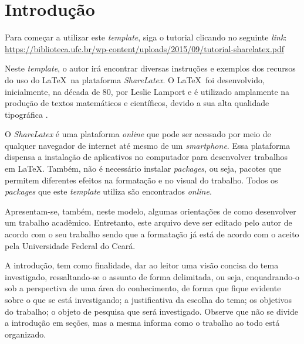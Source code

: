\chapter{Introdução}
\label{cap:introducao}


Para começar a utilizar este \textit{template}, siga o tutorial clicando no seguinte \textit{link}:
\url{https://biblioteca.ufc.br/wp-content/uploads/2015/09/tutorial-sharelatex.pdf}

Neste \textit{template}, o autor irá encontrar diversas instruções e exemplos dos recursos do uso do \LaTeX~na plataforma \textit{ShareLatex}. O \LaTeX~foi desenvolvido, inicialmente, na década de 80, por Leslie Lamport e é utilizado amplamente na produção de textos matemáticos e científicos, devido a sua alta qualidade tipográfica \cite{goossens1994latex}. 

O \textit{ShareLatex} é uma plataforma \textit{online} que pode ser acessado por meio de qualquer navegador de internet até mesmo de um \textit{smartphone}. Essa plataforma dispensa a instalação de aplicativos no computador para desenvolver trabalhos em \LaTeX. Também, não é necessário instalar \textit{packages}, ou seja, pacotes que permitem diferentes efeitos na formatação e no visual do trabalho. Todos os \textit{packages} que este \textit{template} utiliza são encontrados \textit{online}. 

Apresentam-se, também, neste modelo, algumas orientações de como desenvolver um trabalho acadêmico. Entretanto, este arquivo deve ser editado pelo autor de acordo com o seu trabalho sendo que a formatação já está de acordo com o aceito pela Universidade Federal do Ceará.  

A introdução, tem como finalidade, dar ao leitor uma visão concisa do tema investigado, ressaltando-se o assunto de forma delimitada, ou seja, enquadrando-o sob a perspectiva de uma área do conhecimento, de forma que fique evidente sobre o que se está investigando; a justificativa da escolha do tema; os objetivos do trabalho; o objeto de pesquisa que será investigado. Observe que não se divide a introdução em seções, mas a mesma informa como o trabalho ao todo está organizado.




